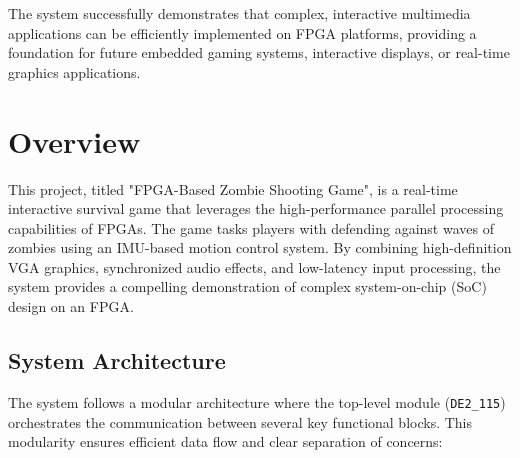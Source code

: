 \documentclass[12pt,a4paper]{article}
\begin{document}
The system successfully demonstrates that complex, interactive multimedia applications can be efficiently implemented on FPGA platforms, providing a foundation for future embedded gaming systems, interactive displays, or real-time graphics applications.

\section{Overview}

This project, titled "FPGA-Based Zombie Shooting Game", is a real-time interactive survival game that leverages the high-performance parallel processing capabilities of FPGAs. The game tasks players with defending against waves of zombies using an IMU-based motion control system. By combining high-definition VGA graphics, synchronized audio effects, and low-latency input processing, the system provides a compelling demonstration of complex system-on-chip (SoC) design on an FPGA.

\subsection{System Architecture}

The system follows a modular architecture where the top-level module (\texttt{DE2\_115}) orchestrates the communication between several key functional blocks. This modularity ensures efficient data flow and clear separation of concerns:
\end{document}
